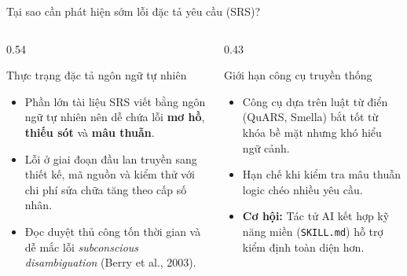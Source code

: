 \documentclass[aspectratio=169,10pt]{beamer}
\begin{document}
\begin{frame}{Tại sao cần phát hiện sớm lỗi đặc tả yêu cầu (SRS)?}
  \begin{columns}[T]
    \begin{column}{0.54\textwidth}
      \begin{block}{Thực trạng đặc tả ngôn ngữ tự nhiên}
        \begin{itemize}
          \item Phần lớn tài liệu SRS viết bằng ngôn ngữ tự nhiên nên dễ chứa lỗi \textbf{mơ hồ}, \textbf{thiếu sót} và \textbf{mâu thuẫn}.
          \item Lỗi ở giai đoạn đầu lan truyền sang thiết kế, mã nguồn và kiểm thử với chi phí sửa chữa tăng theo cấp số nhân.
          \item Đọc duyệt thủ công tốn thời gian và dễ mắc lỗi \textit{subconscious disambiguation} (Berry et al., 2003).
        \end{itemize}
      \end{block}
    \end{column}
    \begin{column}{0.43\textwidth}
      \begin{block}{Giới hạn công cụ truyền thống}
        \begin{itemize}
          \item Công cụ dựa trên luật từ điển (QuARS, Smella) bắt tốt từ khóa bề mặt nhưng khó hiểu ngữ cảnh.
          \item Hạn chế khi kiểm tra mâu thuẫn logic chéo nhiều yêu cầu.
          \item \textbf{Cơ hội:} Tác tử AI kết hợp kỹ năng miền (\texttt{SKILL.md}) hỗ trợ kiểm định toàn diện hơn.
        \end{itemize}
      \end{block}
    \end{column}
  \end{columns}
\end{frame}
\end{document}
